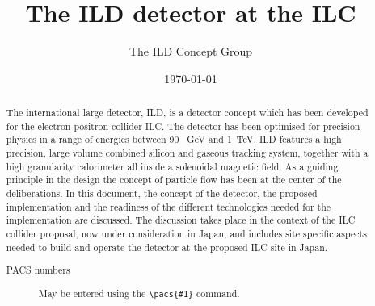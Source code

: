 \documentclass[%
 amsmath,amssymb,
 aps,
]{revtex4-1}
\begin{document}


\title{The ILD detector at the ILC}%

\author{The ILD Concept Group}




\date{\today}%

\begin{abstract}
The international large detector, ILD, is a detector concept which has been developed for the electron positron collider ILC. The detector has been optimised for precision physics in a range of energies between 90 ~GeV and 1~TeV. ILD features a high precision, large volume combined silicon and gaseous tracking system, together with a high granularity calorimeter all inside a solenoidal magnetic field. As a guiding principle in the design the concept of particle flow has been at the center of the deliberations. In this document, the concept of the detector, the proposed implementation and the readiness of the different technologies needed for the implementation are discussed. The discussion takes place in the context of the ILC collider proposal, now under consideration in Japan, and includes site specific aspects needed to build and operate the detector at the proposed ILC site in Japan.

\begin{description}
\item[PACS numbers]
May be entered using the \verb+\pacs{#1}+ command.
\end{description}
\end{abstract}
\end{document}
